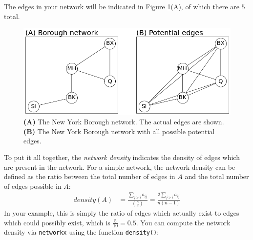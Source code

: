 The edges in your network will be indicated in Figure \ref{fig:ch4:density}(A), of which there are $5$ total. 

\begin{figure}[h]
    \centering
    \includegraphics[width=0.8\linewidth]{representations/ch4/Images/density.png}
    \caption[Visualizing network density]{\textbf{(A)} The New York Borough network. The actual edges are shown. \textbf{(B)} The New York Borough network with all possible potential edges.}
    \label{fig:ch4:density}
\end{figure}

To put it all together, the \textit{network density} indicates the {density of edges} which are present in the network. For a simple network, the network density can be defined as the ratio between the total number of edges in $A$ and the total number of edges possible in $A$:
\begin{align}
    density(A) &= \frac{\sum_{j > i}a_{ij}}{\binom n 2} = \frac{2\sum_{j > i}a_{ij}}{n(n - 1)}
    \label{eqn:ch4:netdens}
\end{align}
In your example, this is simply the ratio of edges which {actually} exist to edges which could {possibly} exist, which is $\frac{5}{10} = 0.5$. You can compute the network density via \texttt{networkx} using the function \texttt{density()}:

